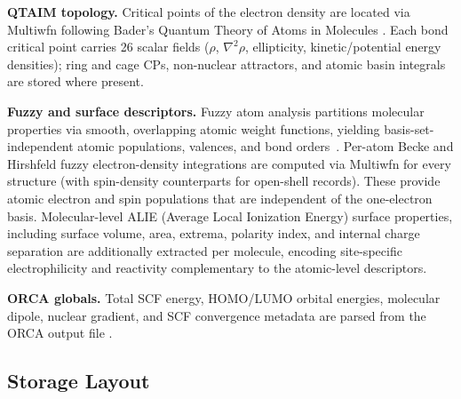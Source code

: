 \textbf{QTAIM topology.}
Critical points of the electron density are located via Multiwfn following Bader's
Quantum Theory of Atoms in Molecules \citep{bader1990}.
Each bond critical point carries 26 scalar fields ($\rho$, $\nabla^2\rho$,
ellipticity, kinetic/potential energy densities); ring and cage CPs, non-nuclear
attractors, and atomic basin integrals are stored where present.

\textbf{Fuzzy and surface descriptors.}
Fuzzy atom analysis partitions molecular properties via smooth, overlapping atomic
weight functions, yielding basis-set-independent atomic populations, valences, and
bond orders~\citep{mayersalvador2004}.
Per-atom Becke and Hirshfeld fuzzy electron-density integrations \citep{becke1988}
are computed via Multiwfn for every structure (with spin-density counterparts for
open-shell records).
These provide atomic electron and spin populations that are independent of the
one-electron basis. Molecular-level ALIE (Average Local Ionization Energy) 
surface properties, including surface volume, area, extrema, polarity index, 
and internal charge separation are additionally extracted per molecule, 
encoding site-specific electrophilicity and reactivity complementary 
to the atomic-level descriptors.

\textbf{ORCA globals.}
Total SCF energy, HOMO/LUMO orbital energies, molecular dipole, nuclear gradient, and
SCF convergence metadata are parsed from the ORCA output file \citep{orca5,ORCA}.


\subsection{Storage Layout}
\label{sec:storage}

